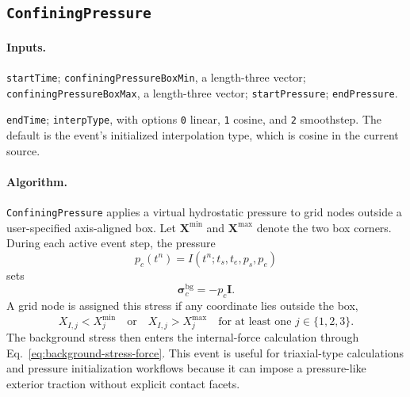\subsection{\texttt{ConfiningPressure}}
\label{subsec:event-confining-pressure}

\paragraph{Inputs.}
\begin{description}[leftmargin=*,style=nextline]
\item[\textbf{Required.}] \texttt{startTime}; \texttt{confiningPressureBoxMin}, a length-three vector; \texttt{confiningPressureBoxMax}, a length-three vector; \texttt{startPressure}; \texttt{endPressure}.
\item[\textbf{Optional.}] \texttt{endTime}; \texttt{interpType}, with options \texttt{0} linear, \texttt{1} cosine, and \texttt{2} smoothstep.  The default is the event's initialized interpolation type, which is cosine in the current source.
\end{description}

\paragraph{Algorithm.}
\texttt{ConfiningPressure} applies a virtual hydrostatic pressure to grid nodes outside a user-specified axis-aligned box.  Let $\mathbf{X}^{\min}$ and $\mathbf{X}^{\max}$ denote the two box corners.  During each active event step, the pressure
\begin{equation}
  p_c(t^n)=I(t^n;t_s,t_e,p_s,p_e)
\end{equation}
sets
\begin{equation}
  \boldsymbol{\sigma}^{\mathrm{bg}}_c=-p_c\mathbf{I}.
\end{equation}
A grid node is assigned this stress if any coordinate lies outside the box,
\begin{equation}
  X_{I,j}<X^{\min}_j\quad \text{or}\quad X_{I,j}>X^{\max}_j
  \quad \text{for at least one } j\in\{1,2,3\}.
\end{equation}
The background stress then enters the internal-force calculation through Eq.~\eqref{eq:background-stress-force}.  This event is useful for triaxial-type calculations and pressure initialization workflows because it can impose a pressure-like exterior traction without explicit contact facets.

